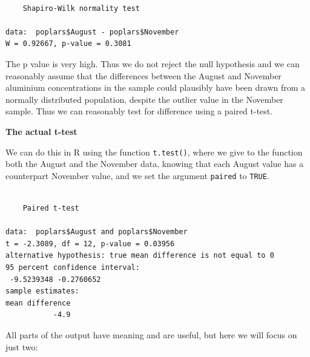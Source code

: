 \documentclass[
  letterpaper,
  DIV=11,
  numbers=noendperiod]{scrreprt}
\newenvironment{Shaded}{\begin{snugshade}}{\end{snugshade}}
\newcommand{\AttributeTok}[1]{\textcolor[rgb]{0.40,0.45,0.13}{#1}}
\newcommand{\ConstantTok}[1]{\textcolor[rgb]{0.56,0.35,0.01}{#1}}
\newcommand{\FunctionTok}[1]{\textcolor[rgb]{0.28,0.35,0.67}{#1}}
\newcommand{\NormalTok}[1]{\textcolor[rgb]{0.00,0.23,0.31}{#1}}
\newcommand{\SpecialCharTok}[1]{\textcolor[rgb]{0.37,0.37,0.37}{#1}}
\begin{document}
\begin{Shaded}
\end{Shaded}

\begin{verbatim}

    Shapiro-Wilk normality test

data:  poplars$August - poplars$November
W = 0.92667, p-value = 0.3081
\end{verbatim}

The p value is very high. Thus we do not reject the null hypothesis and
we can reasonably assume that the differences between the August and
November aluminium concentrations in the sample could plausibly have
been drawn from a normally distributed population, despite the outlier
value in the November sample. Thus we can reasonably test for difference
using a paired t-test.

\textbf{The actual t-test}

We can do this in R using the function \texttt{t.test()}, where we give
to the function both the August and the November data, knowing that each
August value has a counterpart November value, and we set the argument
\texttt{paired} to \texttt{TRUE}.

\begin{Shaded}
\end{Shaded}

\begin{verbatim}

    Paired t-test

data:  poplars$August and poplars$November
t = -2.3089, df = 12, p-value = 0.03956
alternative hypothesis: true mean difference is not equal to 0
95 percent confidence interval:
 -9.5239348 -0.2760652
sample estimates:
mean difference 
           -4.9 
\end{verbatim}

All parts of the output have meaning and are useful, but here we will
focus on just two:
\end{document}
